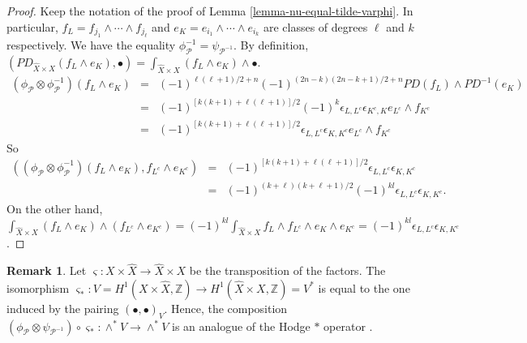 \documentclass[12pt]{amsart}
\numberwithin{equation}{subsection}
\theoremstyle{plain}
\theoremstyle{definition}
\newtheorem{rem}[thm]{Remark}
\newcommand{\ZZ}{{\mathbb Z}}
\renewcommand{\P}{{\mathcal P}}
\begin{document}
\begin{proof} Keep the notation of the proof of Lemma \ref{lemma-nu-equal-tilde-varphi}.
In particular, $f_L=f_{j_1}\wedge \cdots\wedge f_{j_\ell}$ and
$e_K=e_{i_1}\wedge\cdots\wedge e_{i_k}$ are classes of degrees $\ell$ and $k$ respectively.
We have the equality $\phi_\P^{-1}=\psi_{\P^{-1}}$. By definition,
$(PD_{\hat{X}\times X}(f_L\wedge e_K),\bullet)=\int_{\hat{X}\times X}(f_L\wedge e_K)\wedge\bullet$.
\begin{eqnarray*}
(\phi_\P\otimes\phi_\P^{-1})(f_L\wedge e_K) & = & (-1)^{\ell(\ell+1)/2+n}(-1)^{(2n-k)(2n-k+1)/2+n}PD(f_L)\wedge PD^{-1}(e_K)
\\
&=& (-1)^{[k(k+1)+\ell(\ell+1)]/2}(-1)^k\epsilon_{L,L^c}\epsilon_{K^c,K}e_{L^c}\wedge f_{K^c}
\\
&=&
(-1)^{[k(k+1)+\ell(\ell+1)]/2}\epsilon_{L,L^c}\epsilon_{K,K^c}e_{L^c}\wedge f_{K^c}
\end{eqnarray*}
So 
\begin{eqnarray*}
((\phi_\P\otimes\phi_\P^{-1})(f_L\wedge e_K) ,f_{L^c}\wedge e_{K^c})&=&(-1)^{[k(k+1)+\ell(\ell+1)]/2}\epsilon_{L,L^c}\epsilon_{K,K^c}
\\
&=& (-1)^{(k+\ell)(k+\ell+1)/2}(-1)^{kl}\epsilon_{L,L^c}\epsilon_{K,K^c}.
\end{eqnarray*}
On the other hand, 
$\int_{\hat{X}\times X}(f_L\wedge e_K)\wedge (f_{L^c}\wedge e_{K^c})=(-1)^{kl}\int_{\hat{X}\times X}f_L\wedge f_{L^c}\wedge e_K\wedge e_{K^c}=
(-1)^{kl}\epsilon_{L,L^c}\epsilon_{K,K^c}$.
\end{proof}

\begin{rem}
Let $\varsigma:X\times \hat{X}\rightarrow \hat{X}\times X$ be the transposition of the factors. The isomorphism $\varsigma_*:V=H^1(X\times\hat{X},\ZZ)\rightarrow H^1(\hat{X}\times X,\ZZ)=V^*$ is equal to the one induced by the pairing $(\bullet,\bullet)_V$. Hence, the composition $(\phi_\P\otimes \psi_{\P^{-1}})\circ \varsigma_*:\wedge^*V\rightarrow\wedge^*V$ 
is an analogue of the Hodge $*$ operator \cite[Sec. 1.2]{huybrechts-complex-geometry-book}.
\end{rem}

% 
\end{document}
